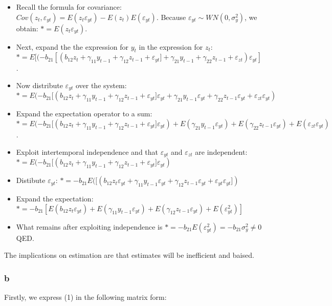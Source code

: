 \documentclass[]{article}
\begin{document}
\begin{itemize}
\item
  Recall the formula for covariance:
  \(Cov(z_t, \varepsilon_{yt}) = E(z_t\varepsilon_{yt})-E(z_t)E(\varepsilon_{yt})\).
  Because \(\varepsilon_{yt} \sim WN(0,\sigma_y^2)\), we obtain:
  \(* = E(z_t\varepsilon_{yt})\).
\item
  Next, expand the the expression for \(y_t\) in the expression for
  \(z_t\):
  \(* = E[(-b_{21}[(b_{12}z_t + \gamma_{11}y_{t-1} + \gamma_{12}z_{t-1} + \varepsilon_{yt}] + \gamma_{21}y_{t-1}+\gamma_{22}z_{t-1} + \varepsilon_{zt})\varepsilon_{yt}]\).
\item
  Now distribute \(\varepsilon_{yt}\) over the system:
  \(* = E(-b_{21}[(b_{12}z_t + \gamma_{11}y_{t-1} + \gamma_{12}z_{t-1} + \varepsilon_{yt}]\varepsilon_{yt} + \gamma_{21}y_{t-1}\varepsilon_{yt} + \gamma_{22}z_{t-1}\varepsilon_{yt} + \varepsilon_{zt}\varepsilon_{yt})\)
\item
  Expand the expectation operator to a sum:
  \(* = E(-b_{21}[(b_{12}z_t + \gamma_{11}y_{t-1} + \gamma_{12}z_{t-1} + \varepsilon_{yt}]\varepsilon_{yt}) + E(\gamma_{21}y_{t-1}\varepsilon_{yt}) + E(\gamma_{22}z_{t-1}\varepsilon_{yt}) + E(\varepsilon_{zt}\varepsilon_{yt})\).
\item
  Exploit intertemporal independence and that \(\varepsilon_{yt}\) and
  \(\varepsilon_{zt}\) are independent:
  \(* = E(-b_{21}[(b_{12}z_t + \gamma_{11}y_{t-1} + \gamma_{12}z_{t-1} + \varepsilon_{yt}]\varepsilon_{yt})\)
\item
  Distibute \(\varepsilon_{yt}\):
  \(* = -b_{21}E([(b_{12}z_t\varepsilon_{yt} + \gamma_{11}y_{t-1}\varepsilon_{yt} + \gamma_{12}z_{t-1}\varepsilon_{yt} + \varepsilon_{yt}\varepsilon_{yt}])\)
\item
  Expand the expectation:
  \(*=-b_{21}[E(b_{12}z_t\varepsilon_{yt})+ E(\gamma_{11}y_{t-1}\varepsilon_{yt}) + E(\gamma_{12}z_{t-1}\varepsilon_{yt}) + E(\varepsilon_{yt}^2)]\)
\item
  What remains after exploiting independence is
  \(*=-b_{21} E(\varepsilon_{yt}^2) = -b_{21}\sigma_y^2 \neq 0\) QED.
\end{itemize}

The implications on estimation are that estimates will be inefficient
and baised.

\subsubsection{b}\label{b}

Firstly, we express (1) in the following matrix form:
\end{document}
